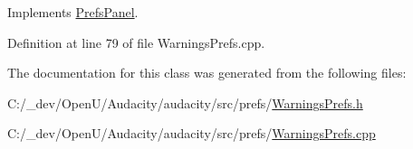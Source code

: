 Implements \hyperlink{class_prefs_panel_ab5572aedab201c47fbbdf714c6a2b781}{Prefs\+Panel}.



Definition at line 79 of file Warnings\+Prefs.\+cpp.



The documentation for this class was generated from the following files\+:\begin{DoxyCompactItemize}
\item 
C\+:/\+\_\+dev/\+Open\+U/\+Audacity/audacity/src/prefs/\hyperlink{_warnings_prefs_8h}{Warnings\+Prefs.\+h}\item 
C\+:/\+\_\+dev/\+Open\+U/\+Audacity/audacity/src/prefs/\hyperlink{_warnings_prefs_8cpp}{Warnings\+Prefs.\+cpp}\end{DoxyCompactItemize}
